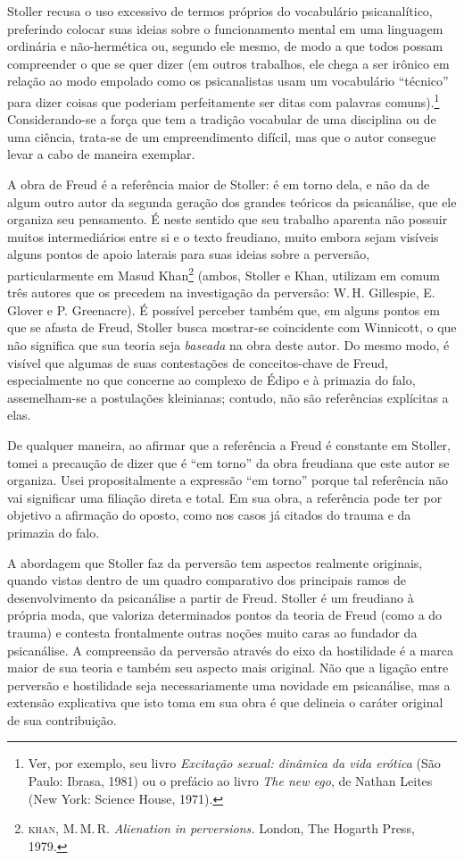 Stoller recusa o uso excessivo de termos próprios do vocabulário
psicanalítico, preferindo colocar suas ideias sobre o funcionamento
mental em uma linguagem ordinária e não-hermética ou, segundo ele mesmo,
de modo a que todos possam compreender o que se quer dizer (em outros
trabalhos, ele chega a ser irônico em relação ao modo empolado como os
psicanalistas usam um vocabulário ``técnico'' para dizer coisas que
poderiam perfeitamente ser ditas com palavras comuns).\footnote{Ver, por
  exemplo, seu livro \emph{Excitação sexual: dinâmica da vida erótica}
  (São Paulo: Ibrasa, 1981) ou o prefácio ao livro \emph{The new ego},
  de Nathan Leites (New York: Science House, 1971).} Considerando-se a
força que tem a tradição vocabular de uma disciplina ou de uma ciência,
trata-se de um empreendimento difícil, mas que o autor consegue levar a
cabo de maneira exemplar.

A obra de Freud é a referência maior de Stoller: é em torno dela, e não
da de algum outro autor da segunda geração dos grandes teóricos da
psicanálise, que ele organiza seu pensamento. É neste sentido que seu
trabalho aparenta não possuir muitos intermediários entre si e o texto
freudiano, muito embora sejam visíveis alguns pontos de apoio laterais
para suas ideias sobre a perversão, particularmente em Masud
Khan\footnote{\textsc{khan}, M.\,M.\,R. \emph{Alienation in perversions.}
  London, The Hogarth Press, 1979.} (ambos, Stoller e Khan, utilizam em
comum três autores que os precedem na investigação da perversão: W.\,H.
Gillespie, E. Glover e P. Greenacre). É possível perceber também que, em
alguns pontos em que se afasta de Freud, Stoller busca mostrar-se
coincidente com Winnicott, o que não significa que sua teoria seja
\emph{baseada} na obra deste autor. Do mesmo modo, é visível que algumas
de suas contestações de conceitos-chave de Freud, especialmente no que
concerne ao complexo de Édipo e à primazia do falo, assemelham-se a
postulações kleinianas; contudo, não são referências explícitas a elas.

De qualquer maneira, ao afirmar que a referência a Freud é constante em
Stoller, tomei a precaução de dizer que é ``em torno'' da obra freudiana
que este autor se organiza. Usei propositalmente a expressão ``em
torno'' porque tal referência não vai significar uma filiação direta e
total. Em sua obra, a referência pode ter por objetivo a afirmação do
oposto, como nos casos já citados do trauma e da primazia do falo.

A abordagem que Stoller faz da perversão tem aspectos realmente
originais, quando vistas dentro de um quadro comparativo dos principais
ramos de desenvolvimento da psicanálise a partir de Freud. Stoller é um
freudiano à própria moda, que valoriza determinados pontos da teoria de
Freud (como a do trauma) e contesta frontalmente outras noções muito
caras ao fundador da psicanálise. A compreensão da perversão através do
eixo da hostilidade é a marca maior de sua teoria e também seu aspecto
mais original. Não que a ligação entre perversão e hostilidade seja
necessariamente uma novidade em psicanálise, mas a extensão explicativa
que isto toma em sua obra é que delineia o caráter original de sua
contribuição.

